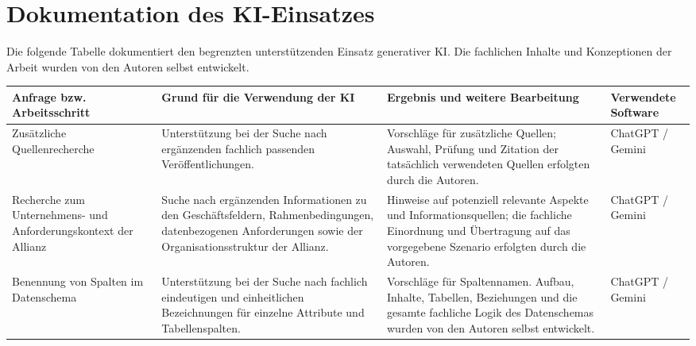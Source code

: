 \section{Dokumentation des KI-Einsatzes}
\label{sec:ki-dokumentation}

Die folgende Tabelle dokumentiert den begrenzten unterstützenden Einsatz
generativer KI. Die fachlichen Inhalte und Konzeptionen der Arbeit wurden von
den Autoren selbst entwickelt.

\begin{center}
\footnotesize
\setlength{\tabcolsep}{3pt}
\renewcommand{\arraystretch}{1.05}
\begin{tabularx}{\textwidth}{|>{\raggedright\arraybackslash}p{3.1cm}|
  >{\raggedright\arraybackslash}X|
  >{\raggedright\arraybackslash}p{4.0cm}|
  >{\raggedright\arraybackslash}p{2.4cm}|}
  \hline
  \textbf{Anfrage bzw. Arbeitsschritt} &
  \textbf{Grund für die Verwendung der KI} &
  \textbf{Ergebnis und weitere Bearbeitung} &
  \textbf{Verwendete Software} \\
  \hline
  Zusätzliche Quellenrecherche &
  Unterstützung bei der Suche nach ergänzenden fachlich passenden
  Veröffentlichungen. &
  Vorschläge für zusätzliche Quellen; Auswahl, Prüfung und Zitation der
  tatsächlich verwendeten Quellen erfolgten durch die Autoren. &
  ChatGPT / Gemini \\
  \hline
  Recherche zum Unternehmens- und Anforderungskontext der Allianz &
  Suche nach ergänzenden Informationen zu den Geschäftsfeldern,
  Rahmenbedingungen, datenbezogenen Anforderungen sowie der Organisationsstruktur der Allianz. &
  Hinweise auf potenziell relevante Aspekte und Informationsquellen; die
  fachliche Einordnung und Übertragung auf das vorgegebene Szenario erfolgten
  durch die Autoren. &
  ChatGPT / Gemini \\
  \hline
  Benennung von Spalten im Datenschema &
  Unterstützung bei der Suche nach fachlich eindeutigen und einheitlichen
  Bezeichnungen für einzelne Attribute und Tabellenspalten. &
  Vorschläge für Spaltennamen. Aufbau, Inhalte, Tabellen, Beziehungen und die
  gesamte fachliche Logik des Datenschemas wurden von den Autoren selbst
  entwickelt. &
  ChatGPT / Gemini\\
  \hline
\end{tabularx}
\end{center}
